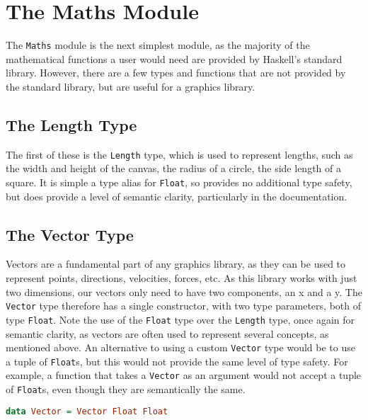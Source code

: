 \documentclass[../main.tex]{subfiles}
\begin{document}
    \section{The Maths Module}
        The \verb|Maths| module is the next simplest module, as the majority of the
            mathematical functions a user would need are provided by Haskell's standard
            library.
        However, there are a few types and functions that are not provided by the
            standard library, but are useful for a graphics library.

        \subsection{The Length Type}
            The first of these is the \verb|Length| type, which is used to represent
                lengths, such as the width and height of the canvas, the radius of a circle,
                the side length of a square.
            It is simple a type alias for \verb|Float|, so provides no additional type
                safety, but does provide a level of semantic clarity, particularly in the
                documentation.

        \subsection{The Vector Type}
            Vectors are a fundamental part of any graphics library, as they can be used to
                represent points, directions, velocities, forces, etc. As this library works
                with just two dimensions, our vectors only need to have two components, an x
                and a y.
            The \verb|Vector| type therefore has a single constructor, with two type
                parameters, both of type \verb|Float|.
            Note the use of the \verb|Float| type over the \verb|Length| type, once again
                for semantic clarity, as vectors are often used to represent several concepts,
                as mentioned above.
            An alternative to using a custom \verb|Vector| type would be to use a tuple of
                \verb|Float|s, but this would not provide the same level of type safety.
            For example, a function that takes a \verb|Vector| as an argument would not
                accept a tuple of \verb|Float|s, even though they are semantically the same.

            \begin{lstlisting}[language=Haskell, label={lst:vector}, caption={The Vector type definition.}]
data Vector = Vector Float Float
            \end{lstlisting}
\end{document}
